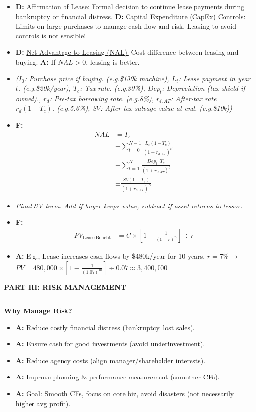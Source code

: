 \documentclass[7pt,landscape]{extarticle} %
\newcommand{\cheatsheetsection}[1]{%
  \vspace{0.25ex plus 0.1ex minus 0.05ex}%
  \noindent\color{SecTitleColor}\textbf{\sffamily\small\MakeUppercase{#1}}%
  \par\vspace{0.02ex}%
  {\color{RuleColor}\hrule height 0.3pt}\par\vspace{0.15ex}%
}
\newcommand{\cheatsheetsubsubsection}[1]{%
  \vspace{0.15ex plus 0.05ex minus 0.05ex}%
  \noindent\textbf{\sffamily\scriptsize #1}%
  \par\vspace{0.05ex}%
}
\newcommand{\D}[1]{\textbf{\textcolor{DefColor}{D:}} \uline{#1}}
\newcommand{\F}[1]{\textbf{\textcolor{FormColor}{F:}} #1}
\newcommand{\A}[1]{\textbf{\textcolor{AppColor}{A:}} #1}
\newcommand{\SF}[1]{\textit{\small (#1)}} %
\begin{document}
\begin{multicols*}{4}
\begin{itemize}
  \item \D{Affirmation of Lease:} Formal decision to continue lease payments during bankruptcy or financial distress.
        \D{Capital Expenditure (CapEx) Controls:} Limits on large purchases to manage cash flow and risk. Leasing to avoid controls is not sensible!

  \item \D{Net Advantage to Leasing (NAL):}  
        Cost difference between leasing and buying.  
        \A{If $NAL > 0$, leasing is better.}

  \item \SF{$I_0$: Purchase price if buying. (e.g.\$100k machine), $L_t$: Lease payment in year $t$. (e.g.\$20k/year), $T_c$: Tax rate. (e.g.30\%), $Dep_t$: Depreciation (tax shield if owned)., $r_d$: Pre-tax borrowing rate. (e.g.8\%), $r_{d,AT}$: After-tax rate = $r_d(1 - T_c)$. (e.g.5.6\%), $SV$: After-tax salvage value at end. (e.g.\$10k)}
  \item \F{
    \begin{align}
      NAL &= I_0 \\
          &- \sum_{t=0}^{N-1} \frac{L_t(1 - T_c)}{(1 + r_{d,AT})^{t'}} \\
          &- \sum_{t=1}^{N} \frac{Dep_t \cdot T_c}{(1 + r_{d,AT})^t} \\
          &\pm \frac{SV(1 - T_c)}{(1 + r_{d,AT})^N}
    \end{align}
  }
  \item \textit{Final SV term: Add if buyer keeps value; subtract if asset returns to lessor.}
  \item \F{
    \begin{align*}
      PV_{\text{Lease Benefit}} &= C \times \left[1 - \frac{1}{(1 + r)^n} \right] \div r
    \end{align*}
  }
  \item \A{E.g., Lease increases cash flows by \$480k/year for 10 years, $r = 7\%$ → $PV = 480{,}000 \times \left[1 - \frac{1}{(1.07)^{10}} \right] \div 0.07 \approx 3{,}400{,}000$}

\end{itemize}


  \cheatsheetsection{Part III: Risk Management}
  
  \cheatsheetsubsubsection{Why Manage Risk?}
  \begin{itemize}
    \item \A{Reduce costly financial distress (bankruptcy, lost sales).}
    \item \A{Ensure cash for good investments (avoid underinvestment).}
    \item \A{Reduce agency costs (align manager/shareholder interests).}
    \item \A{Improve planning \& performance measurement (smoother CFs).}
    \item \A{Goal: Smooth CFs, focus on core biz, avoid disasters (not necessarily higher avg profit).}
  \end{itemize}
  

\end{multicols*}
\end{document}
